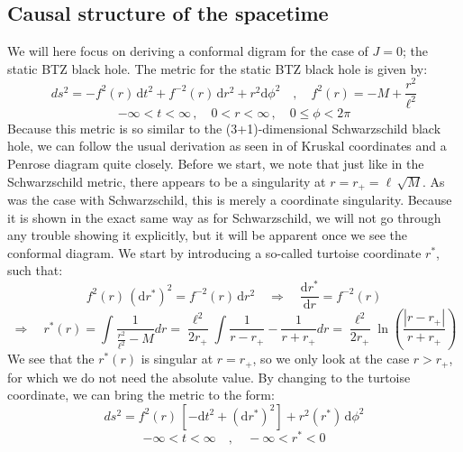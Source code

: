 \subsection{Causal structure of the spacetime}
We will here focus on deriving a conformal digram for the case of $J=0$; the static BTZ black hole. The metric for the static BTZ black hole is given by:
%
%
\begin{equation}\label{static_btz}
ds^2 = -f^2(r) \, \mathrm{d}t^2
+ f^{-2}(r) \, \mathrm{d}r^2
+ r^2 \mathrm{d}\phi^2
\quad , \quad
f^2(r) = -M + \frac{r^2}{\ell^2}
\end{equation}
%
\begin{equation*}
-\infty < t < \infty \, , \quad 0 < r < \infty \, , \quad 0 \leq \phi < 2 \pi
\end{equation*}
%
%
Because this metric is so similar to the (3+1)-dimensional Schwarzschild black hole, we can follow the usual derivation as seen in \cite{GR} of Kruskal coordinates and a Penrose diagram quite closely.\newline
%
%
%
Before we start, we note that just like in the Schwarzschild metric, there appears to be a singularity at $r = r_+ = \ell \, \sqrt{M}$. As was the case with Schwarzschild, this is merely a coordinate singularity. Because it is shown in the exact same way as for Schwarzschild, we will not go through any trouble showing it explicitly, but it will be apparent once we see the conformal diagram.
We start by introducing a so-called turtoise coordinate $r^*$, such that:
%
%
\begin{equation}
f^2(r) \, (\mathrm{d}r^*)^2
= f^{-2}(r) \, \mathrm{d}r^2
\quad \Rightarrow \quad
\frac{\mathrm{d}r^*}{\mathrm{d}r} = f^{-2}(r)
\end{equation}
%
%
\begin{equation}
\Rightarrow \quad
r^*(r) = \int \frac{1}{\frac{r^2}{\ell^2} - M} dr =
\frac{\ell^2}{2 r_+} \int \frac{1}{r - r_+} - \frac{1}{r + r_+} dr =
\frac{\ell^2}{2 r_+} \ln \left( \frac{|r - r_+|}{r + r_+} \right)
\end{equation}
%
%
We see that the $r^*(r)$ is singular at $r = r_+$, so we only look at the case $r > r_+$, for which we do not need the absolute value.
%
%
%
By changing to the turtoise coordinate, we can bring the metric to the form:
%
%
\begin{equation}
ds^2 = f^2(r) \, \left[- \mathrm{d}t^2 + (\mathrm{d}r^*)^2 \right] + r^2(r^*) \, \mathrm{d}\phi^2
\end{equation}
\begin{equation*}
-\infty < t < \infty
\quad , \quad
-\infty < r^* < 0
\end{equation*}
